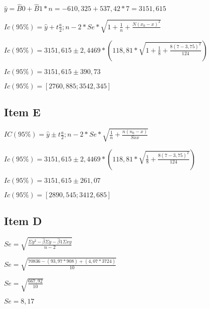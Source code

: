 \documentclass{article}
\begin{document}
\begin{flushleft}
$\hat{y} = \hat{B}0 + \hat{B}1 *n = -610,325 + 537,42 * 7=3151,615$
\end{flushleft}   

\begin{flushleft}
$Ic(95\%) = \hat{y} + t\frac{a}{2};n-2 *Se* \sqrt{1 + \frac{1}{n} +\frac{N(x_0 -x)^2}{}}$

$Ic(95\%) = 3151,615 \pm 2,4469 *  (118,81* \sqrt{1 + \frac{1}{8} + \frac{8(7-3,75)^2}{124}})$

$Ic(95\%) =  3151,615 \pm 390,73$

$Ic(95\%) = [2760,885 ; 3542,345]$
\end{flushleft}


\subsection{Item E}

\begin{flushleft}
$IC(95\%) = \hat{y} \pm  t \frac{a}{2}; n-2 *Se * \sqrt{\frac{1}{n} + \frac{n(n_0 - x)}{Sxx}}$ 

$Ic(95\%) = 3151,615 \pm 2,4469 *  (118,81* \sqrt{\frac{1}{8} + \frac{8(7-3,75)^2}{124}})$

$Ic(95\%) =  3151,615 \pm 261,07$

$Ic(95\%) = [2890,545 ; 3412,685]$

\end{flushleft}








        \subsection{Item D}
            \begin{flushleft}
                $Se = \sqrt{ \frac{\Sigma y^2 - \hat{\beta } \Sigma y - \hat{\beta}1 \Sigma xy }{n-2}}$
            \end{flushleft}    
            
            \begin{flushleft}
                $Se = \sqrt{ \frac{70836 - (93,97*908)+ (4,07*3724) }{10}}$

                $Se = \sqrt{ \frac{667,92 }{10}}$

                $Se = 8,17$
            \end{flushleft}      
\end{document}
